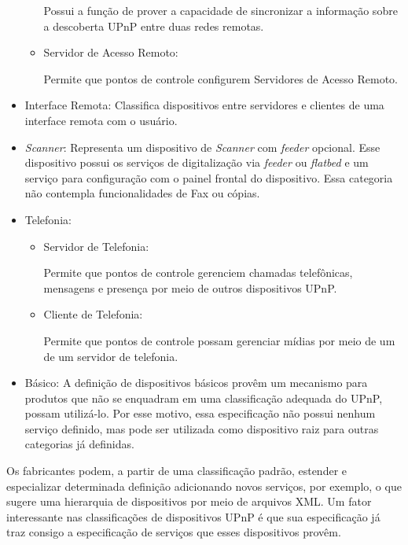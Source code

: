 \begin{itemize}
\begin{itemize}
			Possui a função de prover a capacidade de sincronizar a informação sobre a descoberta UPnP entre duas redes remotas.
		
		\item Servidor de Acesso Remoto:
		
			Permite que pontos de controle configurem Servidores de Acesso Remoto.

	\end{itemize}

\item Interface Remota:
	Classifica dispositivos entre servidores e clientes de uma interface remota com o usuário.

\item \emph{Scanner}:
	Representa um dispositivo de \emph{Scanner} com \emph{feeder} opcional. Esse dispositivo possui os serviços de digitalização via \emph{feeder} ou \emph{flatbed} e um serviço para configuração com o painel frontal do dispositivo. Essa categoria não contempla funcionalidades de Fax ou cópias.

\item Telefonia:
	\begin{itemize}
		\item Servidor de Telefonia:

			Permite que pontos de controle gerenciem chamadas telefônicas, mensagens e presença por meio de outros dispositivos UPnP. 

		\item Cliente de Telefonia:
		
			Permite que pontos de controle possam gerenciar mídias por meio de um de um servidor de telefonia.
				
	\end{itemize}

\item Básico:
	A definição de dispositivos básicos provêm um mecanismo para produtos que não se enquadram em uma classificação adequada do UPnP, possam utilizá-lo. Por esse motivo, essa especificação não possui nenhum serviço definido, mas pode ser utilizada como dispositivo raiz para outras categorias já definidas.
\end{itemize}

Os fabricantes podem, a partir de uma classificação padrão, estender e especializar determinada definição adicionando novos serviços, por exemplo, o que sugere uma hierarquia de dispositivos por meio de arquivos XML. Um fator interessante nas classificações de dispositivos UPnP é que sua especificação já traz consigo a especificação de serviços que esses dispositivos provêm. 
